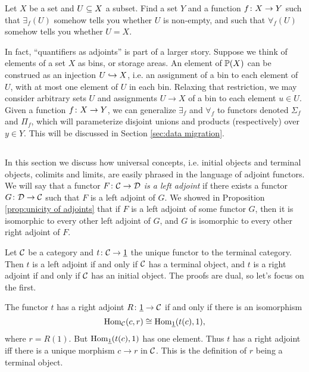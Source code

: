 \documentclass[CT4S-EN-RU]{subfiles}
\begin{document}
\begin{exercise}
Let $X$ be a set and $U\ss X$ a subset. Find a set $Y$ and a function $f\taking X\to Y$ such that $\exists_f(U)$ somehow tells you whether $U$ is non-empty, and such that $\forall_f(U)$ somehow tells you whether $U=X$.
\end{exercise}

In fact, “quantifiers as adjoints” is part of a larger story. Suppose we think of elements of a set $X$ as bins, or storage areas. An element of $\PP(X)$ can be construed as an injection $U\inj X$, i.e. an assignment of a bin to each element of $U$, with at most one element of $U$ in each bin. Relaxing that restriction, we may consider arbitrary sets $U$ and assignments $U\to X$ of a bin to each element $u\in U$. Given a function $f\taking X\to Y$, we can generalize $\exists_f$ and $\forall_f$ to functors denoted $\Sigma_f$ and $\Pi_f$, which will parameterize disjoint unions and products (respectively) over $y\in Y$. This will be discussed in Section \ref{sec:data migration}.


\subsection{}\label{sec:universal concepts}

In this section we discuss how universal concepts, i.e. initial objects and terminal objects, colimits and limits, are easily phrased in the language of adjoint functors. We will say that a functor $F\taking\mcC\to\mcD$ {\em is a left adjoint} if there exists a functor $G\taking\mcD\to\mcC$ such that $F$ is a left adjoint of $G$. We showed in Proposition \ref{prop:unicity of adjoints} that if $F$ is a left adjoint of some functor $G$, then it is isomorphic to every other left adjoint of $G$, and $G$ is isomorphic to every other right adjoint of $F$.

\begin{example}

Let $\mcC$ be a category and $t\taking\mcC\to\ul{1}$ the unique functor to the terminal category. Then $t$ is a left adjoint if and only if $\mcC$ has a terminal object, and $t$ is a right adjoint if and only if $\mcC$ has an initial object. The proofs are dual, so let's focus on the first.

The functor $t$ has a right adjoint $R\taking\ul{1}\to\mcC$ if and only if there is an isomorphism $$\Hom_\mcC(c,r)\iso\Hom_{\ul{1}}(t(c),1),$$ where $r=R(1)$. But $\Hom_{\ul{1}}(t(c),1)$ has one element. Thus $t$ has a right adjoint iff there is a unique morphism $c\to r$ in $\mcC$. This is the definition of $r$ being a terminal object.

\end{example}
\end{document}
